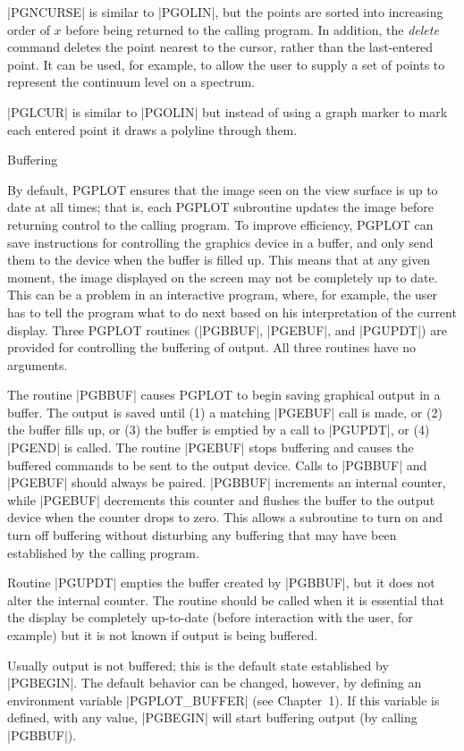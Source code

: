|PGNCURSE| is similar to |PGOLIN|, but the points are sorted into
increasing order of $x$ before being returned to the calling program. In
addition, the {\it delete\/} command deletes the point nearest to the
cursor, rather than the last-entered point. It can be used, for example,
to allow the user to supply a set of points to represent the continuum
level on a spectrum. 

|PGLCUR| is similar to |PGOLIN| but instead of using a graph marker to
mark each entered point it draws a polyline through them. 

\beginsection Buffering

By default, PGPLOT ensures that the image seen on the view surface is up
to date at all times; that is, each PGPLOT subroutine updates the image
before returning control to the calling program. To improve efficiency,
PGPLOT can save instructions for controlling the graphics device in a
buffer, and only send them to the device when the buffer is filled up.
This means that at any given moment, the image displayed on the screen
may not be completely up to date. This can be a problem in an
interactive program, where, for example, the user has to tell the
program what to do next based on his interpretation of the current
display. Three PGPLOT routines (|PGBBUF|, |PGEBUF|, and |PGUPDT|) are provided 
for controlling the buffering of output. All three routines have no 
arguments.

The routine |PGBBUF| causes PGPLOT to begin saving graphical output in a
buffer. The output is saved until (1) a matching |PGEBUF| call is made, or
(2) the buffer fills up, or (3) the buffer is emptied by a call to
|PGUPDT|, or (4) |PGEND| is called.  The routine |PGEBUF| stops buffering and
causes the buffered commands to be sent to the output device. Calls to
|PGBBUF| and |PGEBUF| should always be paired. |PGBBUF| increments an internal
counter, while |PGEBUF| decrements this counter and flushes the buffer to
the output device when the counter drops to zero.  This allows a
subroutine to turn on and turn off buffering without disturbing any
buffering that may have been established by the calling program. 

Routine |PGUPDT| empties the buffer created by |PGBBUF|, but it does not
alter the internal counter. The routine should be called when it is
essential that the display be completely up-to-date (before interaction
with the user, for example) but it is not known if output is being
buffered. 

Usually output is not buffered; this is the default state established by 
|PGBEGIN|. The default behavior can be changed, however, by defining an 
environment variable |PGPLOT_BUFFER| (see Chapter~1). If this variable is 
defined, with any value, |PGBEGIN| will start buffering output
(by calling |PGBBUF|).

